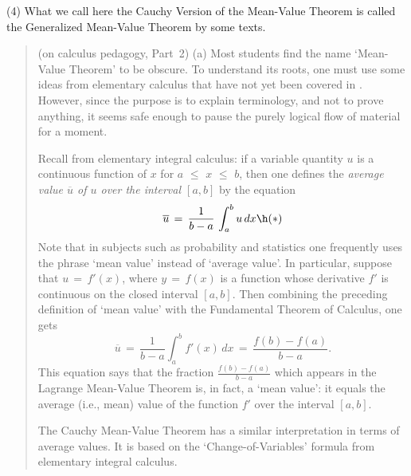        (4) What we call here the Cauchy Version of the Mean-Value Theorem is called the Generalized Mean-Value Theorem by some texts.

\VV

\begin{quotation}
{\footnotesize \underline{\Note} (on calculus pedagogy, Part~2)
 (a) Most students find the name `Mean-Value Theorem' to be obscure. To understand its roots,
    one must use some ideas from elementary calculus that have not yet been covered in {\ThisText}.
    However, since the purpose is to explain terminology, and not to prove anything,
    it seems safe enough to pause the purely logical flow of material for a moment.

        Recall from elementary integral calculus: if a variable quantity $u$ is a continuous function of $x$ for $a\,\,{\leq}\,\,x\,\,{\leq}\,\,b$,
    then one defines the {\em average value $\overline{u}$ of $u$ over the interval $[a,b]$} by the equation 
        \begin{displaymath}
        \overline{u} \,=\, \frac{1}{b-a}\,\int_{a}^{b} u\,dx \h ({\ast})
        \end{displaymath}
    Note that in subjects such as probability and statistics one frequently uses the phrase `mean value' instead of `average value'.
    In particular, suppose that $u \,=\, f'(x)$, where $y \,=\, f(x)$ is a function whose derivative $f'$ is continuous on the closed interval $[a,b]$.
    Then combining the preceding definition of `mean value' with the Fundamental Theorem of Calculus, one gets
        \begin{displaymath}
        \overline{u} \,=\, \frac{1}{b-a}\int_{a}^{b} f'(x)\,dx \,=\, 
    \frac{f(b)-f(a)}{b-a}.
        \end{displaymath}
    This equation says that the fraction ${\displaystyle \frac{f(b)-f(a)}{b-a}}$ which appears in the Lagrange Mean-Value Theorem is, in fact, a `mean value':
    it equals the average (i.e., mean) value of the function $f'$ over the interval $[a,b]$.


        The Cauchy Mean-Value Theorem has a similar interpretation in terms of average values.
    It is based on the `Change-of-Variables' formula from elementary integral calculus.

}
\end{quotation}
